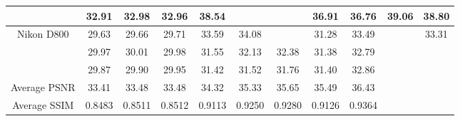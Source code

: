 \documentclass[10pt,twocolumn,letterpaper]{article}
\begin{document}
\begin{table}
\begin{center}
\begin{tabular}{|c||c|c|c|c|c|c|c|c|c|c|}
\cline{2-11}    
& 32.91 & 32.98 & 32.96 & 38.54 & \color{blue}{40.05} & \color{red}{40.59} & 36.91 & 36.76 & 39.06 & 38.80
\\ 
\hline
\multirow{3}{*}{Nikon D800} 
& 29.63 & 29.66 & 29.71 & 33.59 & 34.08 & \color{blue}{34.25} & 31.28 & 33.49 & \color{red}{34.61} & 33.31
\\ 
\cline{2-11} 
\multirow{3}{*}{ISO = 6400}   
& 29.97 & 30.01 & 29.98 & 31.55 & 32.13 & 32.38 & 31.38 & 32.79 & \color{red}{33.21} & \color{blue}{33.18}
\\ 
\cline{2-11}    
& 29.87 & 29.90 & 29.95 & 31.42 & 31.52 & 31.76 & 31.40 & 32.86 & \color{blue}{33.22} & \color{red}{33.35}
\\
\hline
Average PSNR & 33.41 & 33.48 & 33.48 & 34.32 & 35.33 & 35.65 & 35.49 & 36.43 & \color{blue}{36.88} & \color{red}{ 37.26}
\\
\hline
Average SSIM & 0.8483 & 0.8511 & 0.8512 & 0.9113 & 0.9250 & 0.9280 & 0.9126 & 0.9364 & \color{blue}{0.9481} & \color{red}{ 0.9505}
\\
\hline
\end{tabular}
\end{center}
\end{table}
\end{document}
